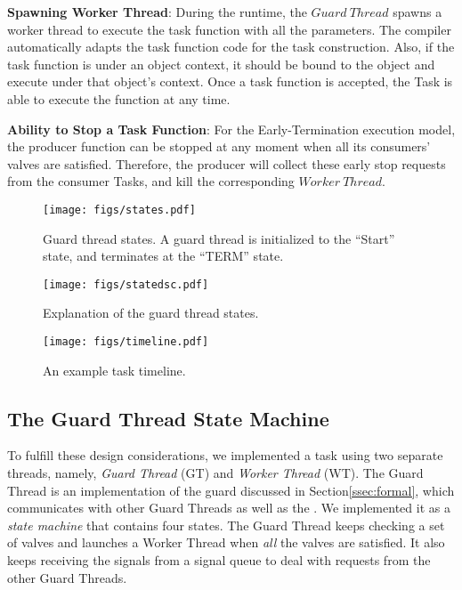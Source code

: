 \noindent\textbf{Spawning Worker Thread}: During the runtime, the $Guard\ Thread$ spawns a worker thread to execute the task function with all the parameters.
The compiler automatically adapts the task function code for the task construction. Also, if the task function is under an object context, it should be bound to the object and execute under that object's context. Once a task function is accepted, the Task is able to execute the function at any time. 

\noindent\textbf{Ability to Stop a Task Function}: For the Early-Termination execution model, the producer function can be stopped at any moment when all its consumers' valves are satisfied. Therefore, the producer will collect these early stop requests from the consumer Tasks, and kill the corresponding $Worker\ Thread$.

\begin{figure}[t]
    \centering
        \texttt{[image: figs/states.pdf]}
\vspace{-12pt}\caption{Guard thread states. A guard thread is initialized to the ``Start'' state, and terminates at the ``TERM'' state.}\label{figs:task_states}\vspace{-4pt}
\end{figure}

\begin{figure}[t]
    \centering
    \vspace{-4pt}
        \texttt{[image: figs/statedsc.pdf]}
    \vspace{-8pt}\caption{Explanation of the guard thread states.}\label{figs:statedsc}\vspace{-18pt}
\end{figure}

\begin{figure}[t]
    \centering
        \texttt{[image: figs/timeline.pdf]}
    \vspace{-20pt}\caption{An example task timeline.}\label{figs:timeline}\vspace{-16pt}
\end{figure}

\subsection{The Guard Thread State Machine}
To fulfill these design considerations, we implemented a task using two separate threads, namely, \textit{Guard Thread} (GT) and \textit{Worker Thread} (WT). The Guard Thread is an implementation of the guard discussed in Section\ref{ssec:formal}, which communicates with other Guard Threads as well as the . We implemented it as a \textit{state machine} that contains four states. The Guard Thread keeps checking a set of valves and launches a Worker Thread when \textit{all} the valves are satisfied. It also keeps receiving the signals from a signal queue to deal with requests from the other Guard Threads.

